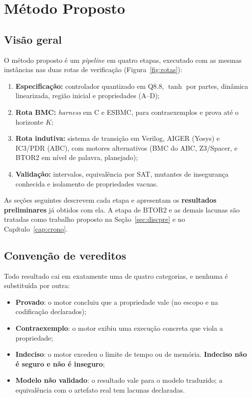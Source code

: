 \documentclass[12pt,openright,oneside,a4paper,chapter=TITLE,sumario=tradicional,english,brazil]{abntex2}
\begin{document}
\chapter{Método Proposto}\label{cap:metod}

\section{Visão geral}

O método proposto é um \emph{pipeline} em quatro etapas, executado com as mesmas instâncias nas duas rotas de verificação (Figura~\ref{fig:rotas}):
\begin{enumerate}
  \item \textbf{Especificação:} controlador quantizado em Q8.8, $\tanh$ por partes, dinâmica linearizada, região inicial e propriedades (A--D);
  \item \textbf{Rota BMC:} \emph{harness} em C e ESBMC, para contraexemplos e prova até o horizonte $K$;
  \item \textbf{Rota indutiva:} sistema de transição em Verilog, AIGER (Yosys) e IC3/PDR (ABC), com motores alternativos (BMC do ABC, Z3/Spacer, e BTOR2 em nível de palavra, planejado);
  \item \textbf{Validação:} intervalos, equivalência por SAT, mutantes de insegurança conhecida e isolamento de propriedades vacuas.
\end{enumerate}
As seções seguintes descrevem cada etapa e apresentam os \textbf{resultados preliminares} já obtidos com ela. A etapa de BTOR2 e as demais lacunas são tratadas como trabalho proposto na Seção~\ref{sec:discpre} e no Capítulo~\ref{cap:crono}.

\section{Convenção de vereditos}

Todo resultado cai em exatamente uma de quatro categorias, e nenhuma é substituída por outra:
\begin{itemize}
  \item \textbf{Provado}: o motor concluiu que a propriedade vale (no escopo e na codificação declarados);
  \item \textbf{Contraexemplo}: o motor exibiu uma execução concreta que viola a propriedade;
  \item \textbf{Indeciso}: o motor excedeu o limite de tempo ou de memória. \textbf{Indeciso não é seguro e não é inseguro};
  \item \textbf{Modelo não validado}: o resultado vale para o modelo traduzido; a equivalência com o artefato real tem lacunas declaradas.
\end{itemize}
\end{document}
